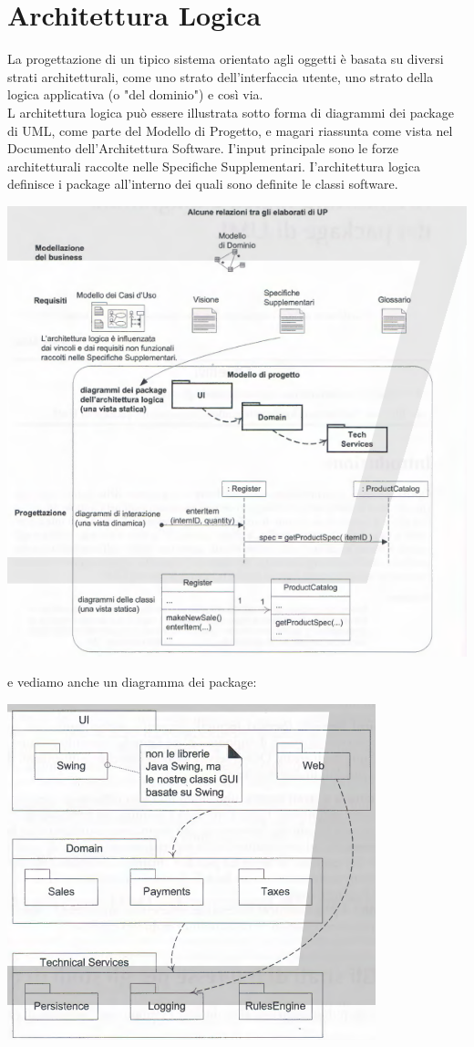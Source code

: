 \documentclass[a4paper,12pt, oneside]{book}
\begin{document}
\chapter{Architettura Logica}
La progettazione di un tipico sistema orientato agli
oggetti è basata su diversi strati architetturali, come uno strato dell'interfaccia utente,
uno strato della logica applicativa (o "del dominio") e così via.\\
L architettura logica può essere illustrata sotto forma di diagrammi dei package
di UML, come parte del Modello di Progetto, e magari riassunta come vista nel Documento
dell'Architettura Software. I'input principale sono le forze architetturali raccolte
nelle Specifiche Supplementari. I'architettura logica definisce i package all'interno dei
quali sono definite le classi software.
\begin{center}
\includegraphics[scale=0.5]{img/log.png}
\end{center}
e vediamo anche un diagramma dei package:
\begin{center}
  \includegraphics[scale=0.6]{img/log2.png}
\end{center}
\end{document}
